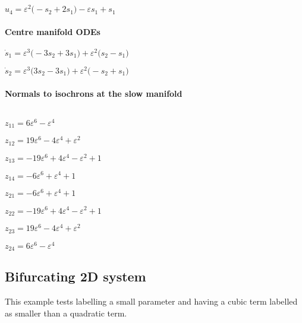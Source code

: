 \documentclass[11pt,a5paper]{article}
\def\eps{\varepsilon}
\begin{document}
\begin{math}
u_{4}=\varepsilon ^{2} \big(-s_{2}+2 s_{1}\big)-
\varepsilon  s_{1}+s_{1}
\end{math}\par


\paragraph{Centre manifold ODEs}

\begin{math}
\dot s_{1}=\varepsilon ^{3} \big(-3 s_{2}+3 s_{1}\big)+
\varepsilon ^{2} \big(s_{2}-s_{1}\big)
\end{math}\par

\begin{math}
\dot s_{2}=\varepsilon ^{3} \big(3 s_{2}-3 s_{1}\big)+
\varepsilon ^{2} \big(-s_{2}+s_{1}\big)
\end{math}

\paragraph{Normals to isochrons at the slow manifold}
\(
\)\par

\(z_{11}=6 \eps^{6}-\eps^{4}
\)\par

\(z_{12}=19 \eps^{6}-4 \eps^{4}+\eps^{2}
\)\par

\(z_{13}=-19 \eps^{6}+4 \eps^{4}-\eps^{2}+1
\)\par

\(z_{14}=-6 \eps^{6}+\eps^{4}+1
\)\par

\(z_{21}=-6 \eps^{6}+\eps^{4}+1
\)\par

\(z_{22}=-19 \eps^{6}+4 \eps^{4}-\eps^{2}+1
\)\par

\(z_{23}=19 \eps^{6}-4 \eps^{4}+\eps^{2}
\)\par

\(z_{24}=6 \eps^{6}-\eps^{4}
\)\par


\subsection{Bifurcating 2D system}

This example tests labelling a small parameter and having a cubic term labelled as smaller than a quadratic term.
\end{document}
